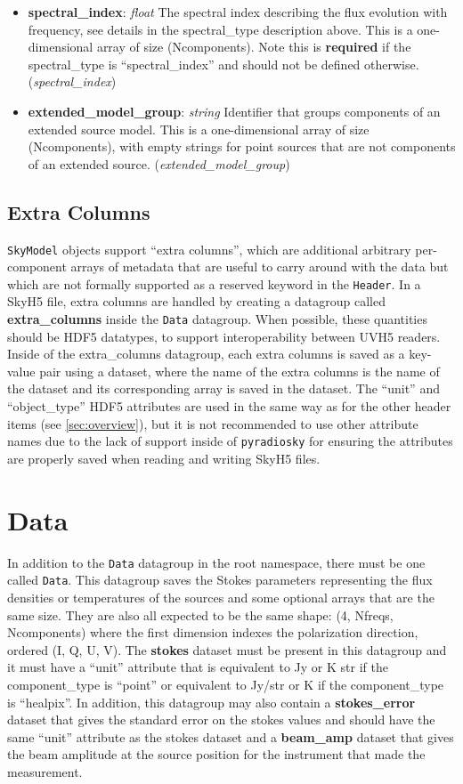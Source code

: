 \documentclass[11pt, oneside]{article}
\begin{document}
\begin{itemize}
\item \textbf{spectral\_index}: \textit{float}
The spectral index describing the flux evolution with frequency, see details in the spectral\_type description above.
This is a one-dimensional array of size (Ncomponents).
Note this is \textbf{required} if the spectral\_type is ``spectral\_index'' and should not be defined otherwise.
(\textit{spectral\_index})

\item \textbf{extended\_model\_group}: \textit{string}
Identifier that groups components of an extended source model.
This is a one-dimensional array of size (Ncomponents), with empty strings for point sources that are not components of an extended source.
(\textit{extended\_model\_group})
\end{itemize}

\subsection{Extra Columns}
\label{sec:extra-columns}
\texttt{SkyModel} objects support ``extra columns'', which are additional arbitrary per-component arrays of metadata that are useful to carry
around with the data but which are not formally supported as a reserved keyword in the \texttt{Header}. In a SkyH5 file,
extra columns are handled by creating a datagroup called \textbf{extra\_columns} inside the \texttt{Data} datagroup.
When possible, these quantities should be HDF5 datatypes, to support interoperability between UVH5 readers.
Inside of the extra\_columns datagroup, each extra columns is saved as a key-value pair using a dataset, where the name of the
extra columns is the name of the dataset and its corresponding array is saved in the dataset. The ``unit'' and ``object\_type'' HDF5 attributes
are used in the same way as for the other header items (see \ref{sec:overview}), but it is not recommended to use other attribute names
due to the lack of support inside of \texttt{pyradiosky} for ensuring the attributes are properly saved when reading and writing SkyH5 files.

\section{Data}
\label{sec:data}
In addition to the \texttt{Data} datagroup in the root namespace, there must be one called \texttt{Data}.
This datagroup saves the Stokes parameters representing the flux densities or temperatures of the sources and
some optional arrays that are the same size. They are also all expected to be the same shape: (4, Nfreqs, Ncomponents)
where the first dimension indexes the polarization direction, ordered (I, Q, U, V).
The \textbf{stokes} dataset must be present in this datagroup and it must have a ``unit'' attribute that is equivalent to Jy or K str if the
component\_type is ``point'' or equivalent to Jy/str or K if the component\_type is ``healpix''.
In addition, this datagroup may also contain a  \textbf{stokes\_error} dataset that gives the standard error on the stokes values and
should have the same ``unit'' attribute as the stokes dataset and a  \textbf{beam\_amp} dataset that gives the beam amplitude at the
source position for the instrument that made the measurement.
\end{document}

